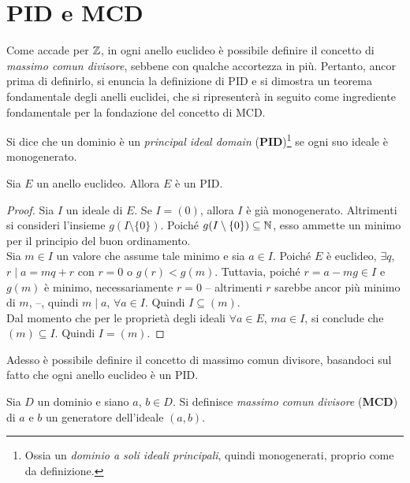 \section{PID e MCD}

Come accade per $\mathbb Z$, in ogni anello euclideo è possibile definire il
concetto di \textit{massimo comun divisore}, sebbene con qualche accortezza
in più. Pertanto, ancor prima di definirlo, si enuncia la definizione di
PID e si dimostra un teorema fondamentale degli anelli euclidei, che
si ripresenterà in seguito come ingrediente fondamentale per la fondazione
del concetto di MCD.

\begin{definition}
    Si dice che un dominio è un \textit{principal ideal domain} (\textbf{PID})\footnote{Ossia un \textit{dominio
            a soli ideali principali}, quindi monogenerati, proprio come da definizione.} se ogni suo ideale è monogenerato.
\end{definition}

\begin{theorem}
    Sia $E$ un anello euclideo. Allora $E$ è un PID.
\end{theorem}

\begin{proof}
    Sia $I$ un ideale di $E$. Se $I = (0)$, allora $I$ è già monogenerato.
    Altrimenti si consideri l'insieme $g(I \setminus \{0\})$. Poiché
    $g(I \setminus \{0\}) \subseteq \mathbb N$,
    esso ammette un minimo per il principio del buon ordinamento. \\

    Sia $m \in I$ un valore che assume tale minimo e sia $a \in I$.
    Poiché $E$ è euclideo, $\exists q$, $r \mid a = mq + r$ con $r=0$ o
    $g(r)<g(m)$. Tuttavia, poiché $r = a-mg \in I$ e $g(m)$ è minimo, necessariamente $r=0$ -- altrimenti $r$ sarebbe
    ancor più minimo di $m$, \Lightning{} --,
    quindi $m \mid a$, $\forall a \in I$. Quindi $I \subseteq (m)$. \\

    Dal momento che per le proprietà degli ideali $\forall a \in E$, $ma \in I$,
    si conclude che $(m) \subseteq I$. Quindi $I = (m)$.
\end{proof}

Adesso è possibile definire il concetto di massimo comun divisore, basandoci
sul fatto che ogni anello euclideo è un PID.

\begin{definition}
    Sia $D$ un dominio e siano $a$, $b \in D$. Si definisce
    \textit{massimo comun divisore} (\textbf{MCD}) di $a$ e $b$ un
    generatore dell'ideale $(a,b)$.
\end{definition}

